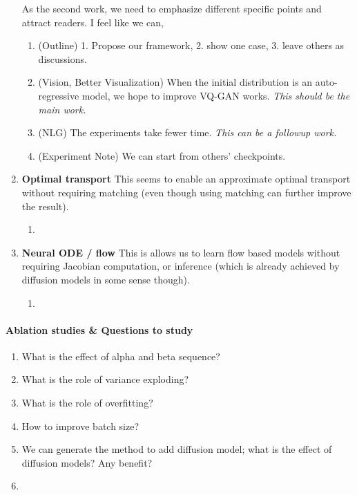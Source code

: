 \begin{enumerate}
    
    As the second work, we need to emphasize different specific points and attract readers. I feel like we can,
    \begin{enumerate}
        \item (Outline) 1. Propose our framework, 2. show one case, 3. leave others as discussions.
        \item (Vision, Better Visualization) When the initial distribution is an auto-regressive model, we hope to improve VQ-GAN works. \emph{This should be the main work.}
        \item (NLG) The experiments take fewer time. \emph{This can be a followup work.}
        \item (Experiment Note) We can start from others' checkpoints. 
        
    \end{enumerate}
\item \textbf{Optimal transport} 
This seems to enable an approximate optimal transport without requiring matching (even though using matching can further improve the result). 
    \begin{enumerate}
        \item {}
    \end{enumerate}
\item \textbf{Neural ODE / flow } 
This is allows us to learn flow based models without requiring Jacobian computation, or inference (which is already achieved by diffusion models in some sense though).
    \begin{enumerate}
        \item {}
    \end{enumerate}

\end{enumerate}

 \paragraph{Ablation studies \& Questions to study}
\begin{enumerate}
    \item What is the effect of alpha and beta sequence? 
    \item What is the role of variance exploding? 
    \item What is the role of overfitting? 
    \item How to improve batch size? 
    \item We can generate the method to add diffusion model; what is the effect of diffusion models? Any benefit?
    \item 
\end{enumerate}

 